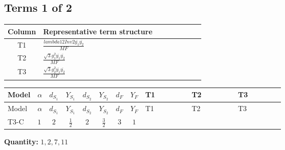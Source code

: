 \documentclass[8pt]{article}
\begin{document}
\begin{landscape}
\subsection*{Terms 1 of 2}
\begin{center}
\begin{tabular}{@{}c >{\raggedright\arraybackslash}p{0.82\linewidth}@{}}
\toprule
Column & Representative term structure \\
\midrule
T1 & \(\displaystyle \frac{lambda12Inv2 \overline{y_{1}} \overline{y_{2}}}{MF}\) \\
\midrule
T2 & \(\displaystyle \frac{\sqrt{3} g_{1}^{2} \overline{y_{1}} \overline{y_{2}}}{MF}\) \\
\midrule
T3 & \(\displaystyle \frac{\sqrt{3} g_{2}^{2} \overline{y_{1}} \overline{y_{2}}}{MF}\) \\
\midrule
\bottomrule
\end{tabular}
\end{center}
\smallskip
\tiny
\begin{longtable}{@{}llcccccc >{\raggedright\arraybackslash}p{0.21\linewidth} >{\raggedright\arraybackslash}p{0.21\linewidth} >{\raggedright\arraybackslash}p{0.21\linewidth}@{}}
\toprule
Model & $\alpha$ & $d_{S_1}$ & $Y_{S_1}$ & $d_{S_2}$ & $Y_{S_2}$ & $d_F$ & $Y_F$ & T1 & T2 & T3 \\
\midrule
\endfirsthead
\toprule
Model & $\alpha$ & $d_{S_1}$ & $Y_{S_1}$ & $d_{S_2}$ & $Y_{S_2}$ & $d_F$ & $Y_F$ & T1 & T2 & T3 \\
\midrule
\endhead
T3-C & $1$ & $2$ & $\frac{1}{2}$ & $2$ & $\frac{3}{2}$ & $3$ & $1$ & \scriptsize\adjustbox{max width=\linewidth}{$\begin{gathered} \frac{lambda12Inv2 \overline{y_{1}} \overline{y_{2}}}{6 MF}\end{gathered}$} & \scriptsize\adjustbox{max width=\linewidth}{$\begin{gathered} \frac{\sqrt{3} g_{1}^{2} \overline{y_{1}} \overline{y_{2}}}{4 MF}\end{gathered}$} & \scriptsize\adjustbox{max width=\linewidth}{$\begin{gathered} \frac{\sqrt{3} g_{2}^{2} \overline{y_{1}} \overline{y_{2}}}{8 MF}\end{gathered}$} \\
\midrule
\bottomrule
\end{longtable}
\clearpage
\noindent\textbf{Quantity: }$\mathrm{1,2,7,11}$\par\smallskip

\end{landscape}
\end{document}
